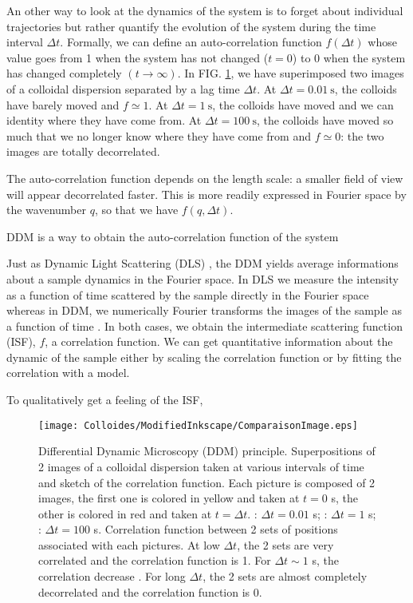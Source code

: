 \documentclass[%
 aip,
 jmp,%
 amsmath,amssymb,
reprint,%
]{revtex4-1}
\newcommand*\circled[1]{\raisebox{0.5pt}{\textcircled{\raisebox{-.9pt} {#1}}}}
\begin{document}
An other way to look at the dynamics of the system is to forget about individual trajectories but rather quantify the evolution of the system during the time interval $\Delta t$. Formally, we can define an auto-correlation function $f(\Delta t)$ whose value goes from 1 when the system has not changed ($t=0$) to 0 when the system has changed completely $(t\rightarrow\infty)$. In FIG. \ref{SketchCorrelation}, we have superimposed two images of a colloidal dispersion separated by a lag time $\Delta t$. At $\Delta t = \SI{0.01}{\second}$, the colloids have barely moved and $f \simeq 1$. At $\Delta t = \SI{1}{\second}$, the colloids have moved and we can identity where they have come from.  At $\Delta t = \SI{100}{\second}$, the colloids have moved so much that we no longer know where they have come from and $f \simeq 0$: the two images are totally decorrelated.


The auto-correlation function depends on the length scale: a smaller field of view will appear decorrelated faster. This is more readily expressed in Fourier space by the wavenumber $q$, so that we have $f(q, \Delta t)$.

DDM is a way to obtain the auto-correlation function of the system

Just as Dynamic Light Scattering (DLS) \citep{18_sartor2003dynamic}, the DDM yields average informations about a sample dynamics in the Fourier space. In DLS we measure the intensity as a function of time scattered by the sample directly in the Fourier space whereas in  DDM, we numerically Fourier transforms the images of the sample as a function of time \citep{2_DDM}. In both cases, we obtain the intermediate scattering function (ISF), $f$, a correlation function. We can get quantitative information about the dynamic of the sample either by scaling the correlation function or by fitting the correlation with a model.



To qualitatively get a feeling of the ISF, 


\begin{figure}
\texttt{[image: Colloides/ModifiedInkscape/ComparaisonImage.eps]}
\caption{Differential Dynamic Microscopy (DDM) principle. Superpositions of 2 images of a colloidal dispersion taken at various intervals of time and sketch of the correlation function. Each picture is composed of 2 images, the first one is colored in yellow and taken at $t = 0$ s, the other is colored in red and taken at $t = \Delta t$. \protect\circled{1}: $\Delta t = 0.01$ s; \protect\circled{2}: $\Delta t = 1$ s; \protect\circled{3}: $\Delta t = 100$ s. Correlation function between 2 sets of positions associated with each pictures. At low $\Delta t$, the 2 sets are very correlated \protect\circled{1} and the correlation function is 1. For $\Delta t \sim 1$ s, the correlation decrease \protect\circled{2}. For long $\Delta t$, the 2 sets are almost completely decorrelated \protect\circled{3} and the correlation function is 0.}
\label{SketchCorrelation}
\end{figure}
\end{document}
